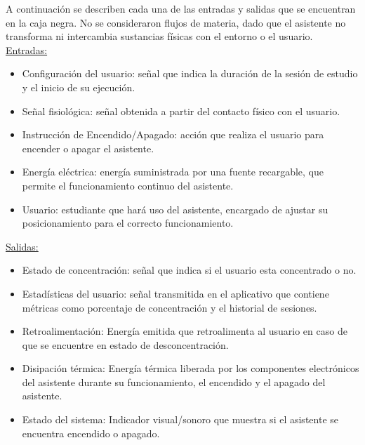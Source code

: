 A continuación se describen cada una de las entradas y salidas que se encuentran en la caja negra. No se consideraron flujos de materia, dado que el asistente no transforma ni intercambia sustancias físicas con el entorno o el usuario.\\

\hspace{-0.8cm}\underline{Entradas:}
\begin{itemize}
           
    \item Configuración del usuario: señal que indica la duración de la sesión de estudio y el inicio de su ejecución.
    \item Señal fisiológica: señal obtenida a partir del contacto físico con el usuario.
    \item Instrucción de Encendido/Apagado: acción que realiza el usuario para encender o apagar el asistente. 
    \item Energía eléctrica: energía suministrada por una fuente recargable, que permite el funcionamiento continuo del asistente.
    \item Usuario: estudiante que hará uso del asistente, encargado de ajustar su posicionamiento para el correcto funcionamiento.

         
\end{itemize}
\underline{Salidas:}
    
\begin{itemize}
    \item Estado de concentración: señal que indica si el usuario esta concentrado o no.
    \item Estadísticas del usuario: señal transmitida en el aplicativo que contiene métricas como porcentaje de concentración y el historial de sesiones.
    \item Retroalimentación: Energía emitida que retroalimenta al usuario en caso de que se encuentre en estado de desconcentración.
    \item Disipación térmica: Energía térmica liberada por los componentes electrónicos del asistente durante su funcionamiento, el encendido y el apagado del asistente.
    \item Estado del sistema: Indicador visual/sonoro que muestra si el asistente se encuentra encendido o apagado.
\end{itemize}


%


